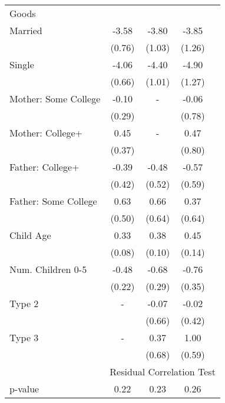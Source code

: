 \begin{tabular}{lcccc}
Goods}\\\cmidrule(r){2-5}Married&-3.58&-3.80&-3.85&\\&(0.76)&(1.03)&(1.26)&\\Single&-4.06&-4.40&-4.90&\\&(0.66)&(1.01)&(1.27)&\\Mother: Some College&-0.10&-&-0.06&\\&(0.29)&&(0.78)&\\Mother: College+&0.45&-&0.47&\\&(0.37)&&(0.80)&\\Father: College+&-0.39&-0.48&-0.57&\\&(0.42)&(0.52)&(0.59)&\\Father: Some College&0.63&0.66&0.37&\\&(0.50)&(0.64)&(0.64)&\\Child Age&0.33&0.38&0.45&\\&(0.08)&(0.10)&(0.14)&\\Num. Children 0-5&-0.48&-0.68&-0.76&\\&(0.22)&(0.29)&(0.35)&\\Type 2&-&-0.07&-0.02&\\&&(0.66)&(0.42)&\\Type 3&-&0.37&1.00&\\&&(0.68)&(0.59)&\\& \multicolumn{4}{c}{Residual Correlation Test}\\\cmidrule(r){2-5}p-value&0.22&0.23&0.26&\\
\bottomrule\end{tabular}